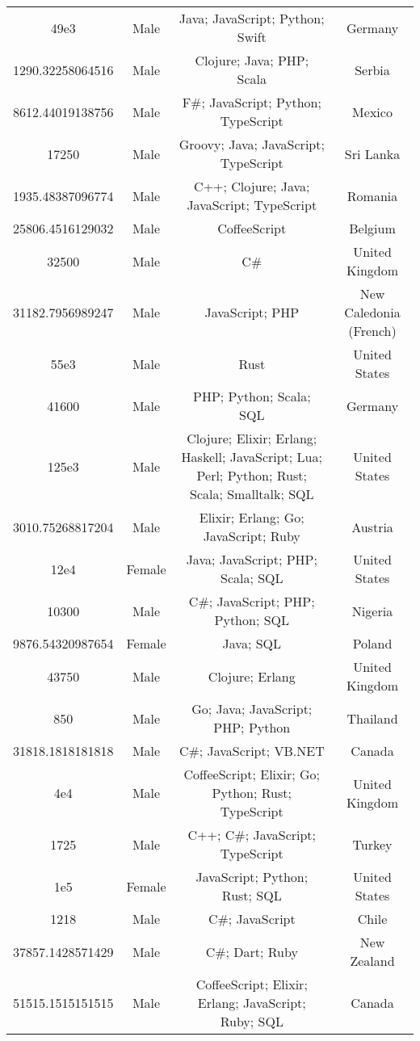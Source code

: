 \begin{center}
\begin{tabular}{ |c|c|c|c| }
49e3  &  Male  &  Java; JavaScript; Python; Swift  &  Germany  \\ 
1290.32258064516  &  Male  &  Clojure; Java; PHP; Scala  &  Serbia  \\ 
8612.44019138756  &  Male  &  F\#; JavaScript; Python; TypeScript  &  Mexico  \\ 
17250  &  Male  &  Groovy; Java; JavaScript; TypeScript  &  Sri Lanka  \\ 
1935.48387096774  &  Male  &  C++; Clojure; Java; JavaScript; TypeScript  &  Romania  \\ 
25806.4516129032  &  Male  &  CoffeeScript  &  Belgium  \\ 
32500  &  Male  &  C\#  &  United Kingdom  \\ 
31182.7956989247  &  Male  &  JavaScript; PHP  &  New Caledonia (French)  \\ 
55e3  &  Male  &  Rust  &  United States  \\ 
41600  &  Male  &  PHP; Python; Scala; SQL  &  Germany  \\ 
125e3  &  Male  &  Clojure; Elixir; Erlang; Haskell; JavaScript; Lua; Perl; Python; Rust; Scala; Smalltalk; SQL  &  United States  \\ 
3010.75268817204  &  Male  &  Elixir; Erlang; Go; JavaScript; Ruby  &  Austria  \\ 
12e4  &  Female  &  Java; JavaScript; PHP; Scala; SQL  &  United States  \\ 
10300  &  Male  &  C\#; JavaScript; PHP; Python; SQL  &  Nigeria  \\ 
9876.54320987654  &  Female  &  Java; SQL  &  Poland  \\ 
43750  &  Male  &  Clojure; Erlang  &  United Kingdom  \\ 
850  &  Male  &  Go; Java; JavaScript; PHP; Python  &  Thailand  \\ 
31818.1818181818  &  Male  &  C\#; JavaScript; VB.NET  &  Canada  \\ 
4e4  &  Male  &  CoffeeScript; Elixir; Go; Python; Rust; TypeScript  &  United Kingdom  \\ 
1725  &  Male  &  C++; C\#; JavaScript; TypeScript  &  Turkey  \\ 
1e5  &  Female  &  JavaScript; Python; Rust; SQL  &  United States  \\ 
1218  &  Male  &  C\#; JavaScript  &  Chile  \\ 
37857.1428571429  &  Male  &  C\#; Dart; Ruby  &  New Zealand  \\ 
51515.1515151515  &  Male  &  CoffeeScript; Elixir; Erlang; JavaScript; Ruby; SQL  &  Canada  \\ 

\end{tabular}
\end{center}
